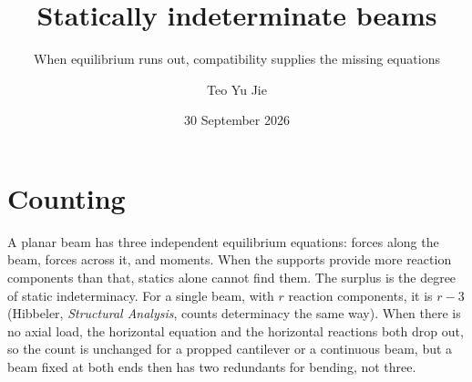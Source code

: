 \documentclass[
  beameroptions={aspectratio=169,ignorenonframetext,11pt},
  articleoptions={11pt,a4paper},
]{beamerswitch}
\title{Statically indeterminate beams}
\subtitle{When equilibrium runs out, compatibility supplies the missing equations}
\author{Teo Yu Jie}
\institute{A recap, with two worked examples}
\date{30 September 2026}
\begin{document}
\begin{frame}[plain]
  \titlepage
\end{frame}


\section{Counting}

A planar beam has three independent equilibrium equations: forces along the
beam, forces across it, and moments. When the supports provide more reaction
components than that, statics alone cannot find them. The surplus is the
degree of static indeterminacy. For a single beam, with $r$ reaction
components, it is $r-3$ (Hibbeler, \emph{Structural Analysis}, counts
determinacy the same way). When there is no axial load, the horizontal
equation and the horizontal reactions both drop out, so the count is unchanged
for a propped cantilever or a continuous beam, but a beam fixed at both ends
then has two redundants for bending, not three.
\end{document}
